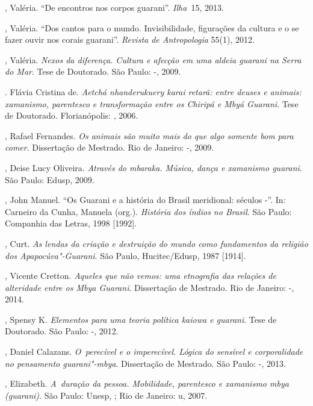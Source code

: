 \begin{Parskip}
, Valéria. ``De encontros nos corpos guarani''. \emph{Ilha~}15, 2013.

, Valéria. ``Dos cantos para o mundo. Invisibilidade, figurações da
cultura e o se fazer ouvir nos corais guarani''. \emph{Revista de Antropologia}
55(1), 2012.

, Valéria. \emph{Nexos da diferença. Cultura e afecção em uma aldeia
guarani na Serra do Mar}. Tese de Doutorado. São Paulo: -, 2009.

. Flávia Cristina de. \emph{Aetchá nhanderukuery karai retarã: entre
deuses e animais: xamanismo, parentesco e transformação entre os
Chiripá e Mbyá Guarani}. Tese de Doutorado. Florianópolis: , 2006.

 , Rafael Fernandes. \emph{Os animais são muito mais do que algo
somente bom para comer}. Dissertação de Mestrado. Rio de Janeiro:
-, 2009.

, Deise Lucy Oliveira. \emph{Através do mbaraka. Música, dança e
xamanismo guarani}. São Paulo: Edusp, 2009.

, John Manuel. ``Os Guarani e a história do Brasil meridional:
séculos -''. In: Carneiro da Cunha, Manuela (org.). \emph{História dos
índios no Brasil}. São Paulo: Companhia das Letras, 1998 [1992].

, Curt. \emph{As lendas da criação e destruição do mundo como
fundamentos da religião dos Apapocúva"-Guarani}. São Paulo,
Hucitec/Edusp, 1987 [1914].

, Vicente Cretton. \emph{Aqueles que não vemos: uma etnografia das
relações de alteridade entre os Mbya Guarani}. Dissertação de Mestrado.
Rio de Janeiro: -, 2014.

, Spensy K. \emph{Elementos para uma teoria política kaiowa e guarani}.
Tese de Doutorado. São Paulo: -, 2012.

, Daniel Calazans. \emph{O~perecível e o imperecível. Lógica do sensível
e corporalidade no pensamento guarani"-mbya}. Dissertação de Mestrado.
São Paulo: -, 2013.

, Elizabeth. \emph{A~duração da pessoa. Mobilidade, parentesco e
xamanismo mbya (guarani)}. São Paulo: Unesp, ; Rio de Janeiro: u,
2007.


\end{Parskip}
